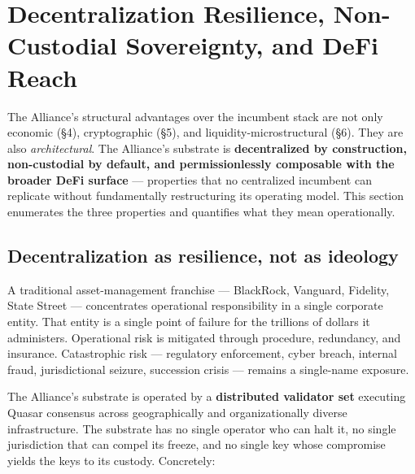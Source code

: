 \section{Decentralization Resilience, Non-Custodial Sovereignty, and DeFi Reach}

The Alliance's structural advantages over the incumbent stack are not
only economic (\S 4), cryptographic (\S 5), and liquidity-microstructural
(\S 6). They are also \emph{architectural}. The Alliance's substrate is
\textbf{decentralized by construction, non-custodial by default, and
permissionlessly composable with the broader DeFi surface} ---
properties that no centralized incumbent can replicate without
fundamentally restructuring its operating model. This section
enumerates the three properties and quantifies what they mean
operationally.

\subsection{Decentralization as resilience, not as ideology}

A traditional asset-management franchise --- BlackRock, Vanguard,
Fidelity, State Street --- concentrates operational responsibility in a
single corporate entity. That entity is a single point of failure for
the trillions of dollars it administers. Operational risk is mitigated
through procedure, redundancy, and insurance. Catastrophic risk ---
regulatory enforcement, cyber breach, internal fraud, jurisdictional
seizure, succession crisis --- remains a single-name exposure.

The Alliance's substrate is operated by a \textbf{distributed validator
set} executing Quasar consensus across geographically and
organizationally diverse infrastructure. The substrate has no single
operator who can halt it, no single jurisdiction that can compel its
freeze, and no single key whose compromise yields the keys to its
custody. Concretely:

